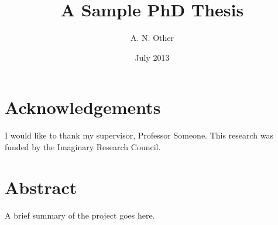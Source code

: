 \documentclass[oneside]{scrbook}
\title{A Sample PhD Thesis}
\author{A. N. Other}
\date{July 2013}
\begin{document}
\maketitle

\frontmatter
\tableofcontents
\listoffigures
\listoftables

\chapter{Acknowledgements}

I would like to thank my supervisor, Professor Someone. This
research was funded by the Imaginary Research Council.

\chapter{Abstract}

A brief summary of the project goes here.

\mainmatter











\backmatter

\end{document}
